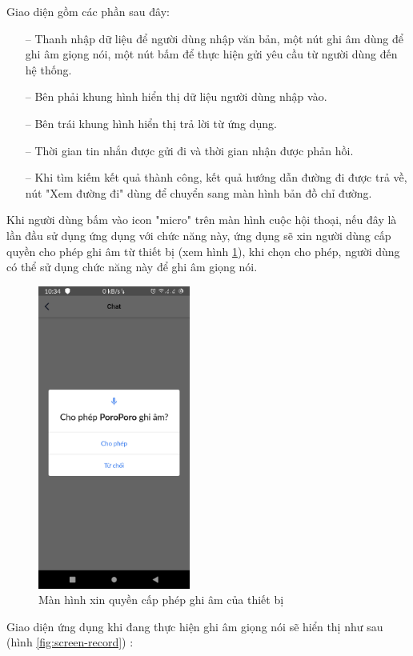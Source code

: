 Giao diện gồm các phần sau đây:
\begin{itemize}
    \item[--] Thanh nhập dữ liệu để người dùng nhập văn bản, một nút ghi âm dùng để ghi âm giọng nói, một nút bấm để thực hiện gửi yêu cầu từ người dùng đến hệ thống.
    \item[--] Bên phải khung hình hiển thị dữ liệu người dùng nhập vào.
    \item[--] Bên trái khung hình hiển thị trả lời từ ứng dụng.
    \item[--] Thời gian tin nhắn được gửi đi và thời gian nhận được phản hồi.
    \item[--] Khi tìm kiếm kết quả thành công, kết quả hướng dẫn đường đi được trả về, nút "Xem đường đi" dùng để chuyển sang màn hình bản đồ chỉ đường.
\end{itemize}

Khi người dùng bấm vào icon "micro" trên màn hình cuộc hội thoại, nếu đây là lần đầu sử dụng ứng dụng với chức năng này, ứng dụng sẽ xin người dùng cấp quyền cho phép ghi âm từ thiết bị (xem hình \ref{fig: accesss-mic}), khi chọn cho phép, người dùng có thể sử dụng chức năng này để ghi âm giọng nói.

\begin{figure}[H]
    \centering
    \includegraphics[width=5cm]{images/access_mic.jpg}
    \caption{Màn hình xin quyền cấp phép ghi âm của thiết bị}
    \label{fig: accesss-mic}
\end{figure}

Giao diện ứng dụng khi đang thực hiện ghi âm giọng nói sẽ hiển thị như sau (hình \ref{fig:screen-record}) :

